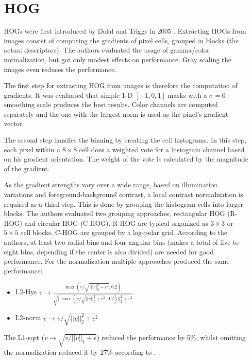 \section{\acf{HOG}}

\ac{HOG}s were first introduced by Dalal and Triggs in 2005 \cite{Dalal2005}. Extracting \ac{HOG}s from images consist of computing the gradients of pixel cells, grouped in blocks (the actual descriptors). The authors evaluated the usage of gamma/color normalization, but got only modest effects on performance. Gray scaling the images even reduces the performance.

The first step for extracting \ac{HOG} from images is therefore the computation of gradients. It was evaluated that simple 1-D $[-1, 0, 1]$ masks with a $\sigma = 0$ smoothing scale produces the best results. Color channels are computed separately and the one with the largest norm is used as the pixel's gradient vector.

The second step handles the binning by creating the cell histograms. In this step, each pixel within a $8 \times 8$ cell does a weighted vote for a histogram channel based on his gradient orientation. The weight of the vote is calculated by the magnitude of the gradient.

As the gradient strengths vary over a wide range, based on illumination variations and foreground-background contrast, a local contrast normalization is required as a third step. This is done by grouping the histogram cells into larger blocks. The authors evaluated two grouping approaches, rectangular HOG (R-HOG) and circular HOG (C-HOG). R-HOG are typical organized as $3\times3$ or $5\times5$ cell blocks. C-HOG are grouped by a log-polar grid. According to the authors, at least two radial bins and four angular bins (makes a total of five to eight bins, depending if the center is also divided) are needed for good performance.
For the normalization multiple approaches produced the same performance:
\begin{itemize}
	\item L2-Hys $v \rightarrow \frac{\max(v / \sqrt{||v||_2^2 + \epsilon^2}, 0.2)}{\sqrt{||\max(v / \sqrt{||v||_2^2 + \epsilon^2}, 0.2)||_2^2 + \epsilon^2}}$ %
	\item L2-norm $v \rightarrow v / \sqrt{||v||_2^2 + \epsilon^2}$
\end{itemize}
The L1-sqrt ($v \rightarrow \sqrt{v / ||v||_1 + \epsilon}$) reduced the performance by 5\%, whilst omitting the normalization reduced it by 27\% according to \cite{Dalal2005}.
